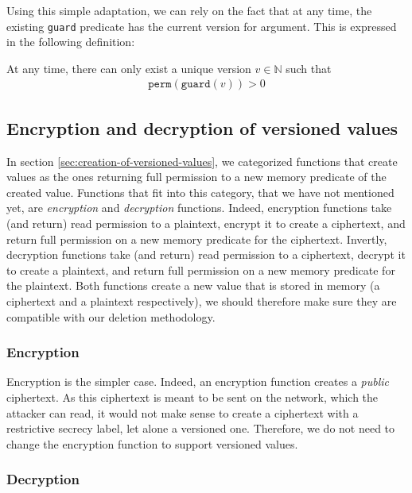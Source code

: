 Using this simple adaptation, we can rely on the fact that at any time, the existing \texttt{guard} predicate has the current version for argument.
This is expressed in the following definition:

\begin{definition}\label{def:unique-version}
    At any time, there can only exist a unique version $v \in \mathbb{N}$ such that
    \begin{align*}
        \texttt{perm}(\texttt{guard}(v)) > 0
    \end{align*}

\end{definition}

\subsection{Encryption and decryption of versioned values}

In section \ref{sec:creation-of-versioned-values}, we categorized functions that create values as the ones returning full permission to a new memory predicate of the created value.
Functions that fit into this category, that we have not mentioned yet, are \emph{encryption} and \emph{decryption} functions.
Indeed, encryption functions take (and return) read permission to a plaintext, encrypt it to create a ciphertext, and return full permission on a new memory predicate for the ciphertext.
Invertly, decryption functions take (and return) read permission to a ciphertext, decrypt it to create a plaintext, and return full permission on a new memory predicate for the plaintext.
Both functions create a new value that is stored in memory (a ciphertext and a plaintext respectively), we should therefore make sure they are compatible with our deletion methodology.

\subsubsection{Encryption}

Encryption is the simpler case. Indeed, an encryption function creates a \emph{public} ciphertext.
As this ciphertext is meant to be sent on the network, which the attacker can read, it would not make sense to create a ciphertext with a restrictive secrecy label, let alone a versioned one.
Therefore, we do not need to change the encryption function to support versioned values.

\subsubsection{Decryption}

